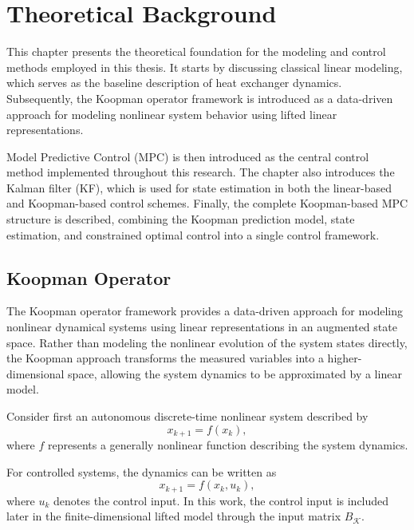 \chapter{Theoretical Background}
\label{ch:theory}

This chapter presents the theoretical foundation for the modeling and control methods employed in this thesis.
It starts by discussing classical linear modeling, which serves as the baseline description of heat exchanger dynamics.
Subsequently, the Koopman operator framework is introduced as a data-driven approach for modeling nonlinear system behavior using lifted linear representations.

Model Predictive Control (MPC) is then introduced as the central control method implemented throughout this research.
The chapter also introduces the Kalman filter (KF), which is used for state estimation in both the linear-based and Koopman-based control schemes. 
Finally, the complete Koopman-based MPC structure is described, combining the Koopman prediction model, state estimation, and constrained optimal control into a single control framework.


\section{Koopman Operator}
\label{sec:Koopman_operator}

The Koopman operator framework provides a data-driven approach for modeling nonlinear dynamical systems using linear representations in an augmented state space.
Rather than modeling the nonlinear evolution of the system states directly, the Koopman approach transforms the measured variables into a higher-dimensional space, allowing the system dynamics to be approximated by a linear model.

Consider first an autonomous discrete-time nonlinear system described by
\begin{equation}
x_{k+1} = f(x_k),
\label{eq:autonomous_nonlinear_system}
\end{equation}
where $f$ represents a generally nonlinear function describing the system dynamics.

For controlled systems, the dynamics can be written as
\begin{equation}
x_{k+1} = f(x_k, u_k),
\label{eq:controlled_nonlinear_system}
\end{equation}
where $u_k$ denotes the control input. In this work, the control input is included later in the finite-dimensional lifted model through the input matrix $B_{\mathcal{K}}$.

